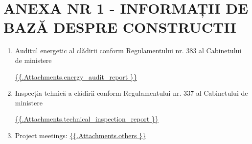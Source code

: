\section{ANEXA NR 1 - INFORMAȚII DE BAZĂ DESPRE CONSTRUCTII}

\begin{enumerate}

	\item Auditul energetic al clădirii conform Regulamentului nr. 383 al Cabinetului de ministere

\url{ {{.Attachments.energy_audit_report }} }

\iffalse attachment value="energy audit report" \fi


	\item Inspecția tehnică a clădirii conform Regulamentului nr. 337 al Cabinetului de ministere

\url{ {{.Attachments.technical_inspection_report }} }

\iffalse attachment value="technical inspection report" \fi

	\item Project meetings:
          \url{ {{.Attachments.others }} }
          \iffalse attachment value="others" \fi

\end{enumerate}
